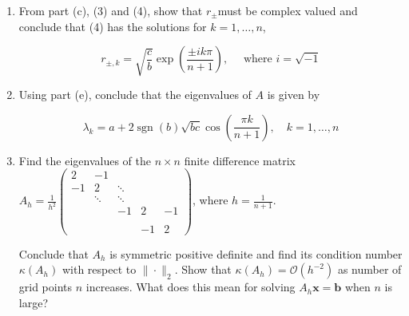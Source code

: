 \documentclass{report}
\begin{document}
{\begin{enumerate}[label=(\alph*)]
		\item From part (c), (3) and (4), show that $r_{ \pm}$must be complex valued and conclude that (4) has the solutions for $k=1, \ldots, n$,

		      $$
			      r_{ \pm, k}=\sqrt{\frac{c}{b}} \exp \left(\frac{ \pm i k \pi}{n+1}\right), \quad \text { where } i=\sqrt{-1}
		      $$

		\item Using part (e), conclude that the eigenvalues of $A$ is given by

		      $$
			      \lambda_k=a+2 \operatorname{sgn}\left(b  \right) \sqrt{bc} \cos \left(\frac{\pi k}{n+1}\right), \quad k=1, \ldots, n
		      $$
		\item
		      Find the eigenvalues of the $n \times n$ finite difference matrix $A_h=\frac{1}{h^2}\left(\begin{array}{ccccc}2 & -1 & && \\ -1 & 2 & \ddots&&  \\ & \ddots & \ddots \\ &&-1&2&-1 \\   &&\\ &&&-1&2 \end{array}\right)$, where $h=\frac{1}{n+1}$.

		      Conclude that $A_h$ is symmetric positive definite and find its condition number $\kappa\left(A_h\right)$ with respect to $\|\cdot\|_2$. Show that $\kappa\left(A_h\right)=\mathcal{O}\left(h^{-2}\right)$ as number of grid points $n$ increases. What does this mean for solving $A_h \boldsymbol{x}=\boldsymbol{b}$ when $n$ is large?

	\end{enumerate}
}
\end{document}
